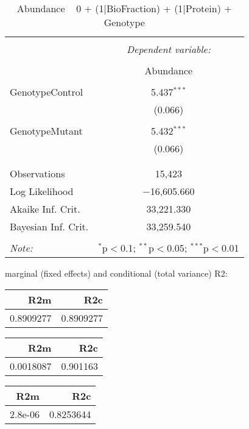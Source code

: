 \documentclass[11pt]{report}
\begin{document}
\begin{table}[!htbp] \centering 
  \caption{Abundance ~ 0 + (1|BioFraction) + (1|Protein) + Genotype} 
  \label{} 
\begin{tabular}{@{\extracolsep{5pt}}lc} 
\\[-1.8ex]\hline 
\hline \\[-1.8ex] 
 & \multicolumn{1}{c}{\textit{Dependent variable:}} \\ 
\cline{2-2} 
\\[-1.8ex] & Abundance \\ 
\hline \\[-1.8ex] 
 GenotypeControl & 5.437$^{***}$ \\ 
  & (0.066) \\ 
  & \\ 
 GenotypeMutant & 5.432$^{***}$ \\ 
  & (0.066) \\ 
  & \\ 
\hline \\[-1.8ex] 
Observations & 15,423 \\ 
Log Likelihood & $-$16,605.660 \\ 
Akaike Inf. Crit. & 33,221.330 \\ 
Bayesian Inf. Crit. & 33,259.540 \\ 
\hline 
\hline \\[-1.8ex] 
\textit{Note:}  & \multicolumn{1}{r}{$^{*}$p$<$0.1; $^{**}$p$<$0.05; $^{***}$p$<$0.01} \\ 
\end{tabular} 
\end{table} 
marginal (fixed effects) and conditional (total variance) R2:

\begin{tabular}{r|r}
\hline
R2m & R2c\\
\hline
0.8909277 & 0.8909277\\
\hline
\end{tabular}

\begin{tabular}{r|r}
\hline
R2m & R2c\\
\hline
0.0018087 & 0.901163\\
\hline
\end{tabular}

\begin{tabular}{r|r}
\hline
R2m & R2c\\
\hline
2.8e-06 & 0.8253644\\
\hline
\end{tabular}
\end{document}
